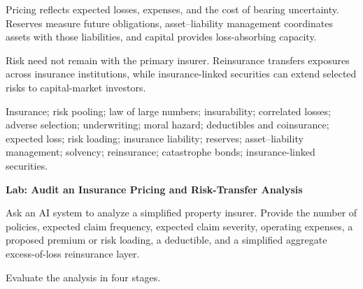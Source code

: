 Pricing reflects expected losses, expenses, and the cost of bearing uncertainty. Reserves measure future obligations, asset--liability management coordinates assets with those liabilities, and capital provides loss-absorbing capacity.

Risk need not remain with the primary insurer. Reinsurance transfers exposures across insurance institutions, while insurance-linked securities can extend selected risks to capital-market investors.




Insurance; risk pooling; law of large numbers; insurability; correlated losses; adverse selection; underwriting; moral hazard; deductibles and coinsurance; expected loss; risk loading; insurance liability; reserves; asset--liability management; solvency; reinsurance; catastrophe bonds; insurance-linked securities.



\textbf{Lab: Audit an Insurance Pricing and Risk-Transfer Analysis}

Ask an AI system to analyze a simplified property insurer. Provide the number of policies, expected claim frequency, expected claim severity, operating expenses, a proposed premium or risk loading, a deductible, and a simplified aggregate excess-of-loss reinsurance layer.

Evaluate the analysis in four stages.

